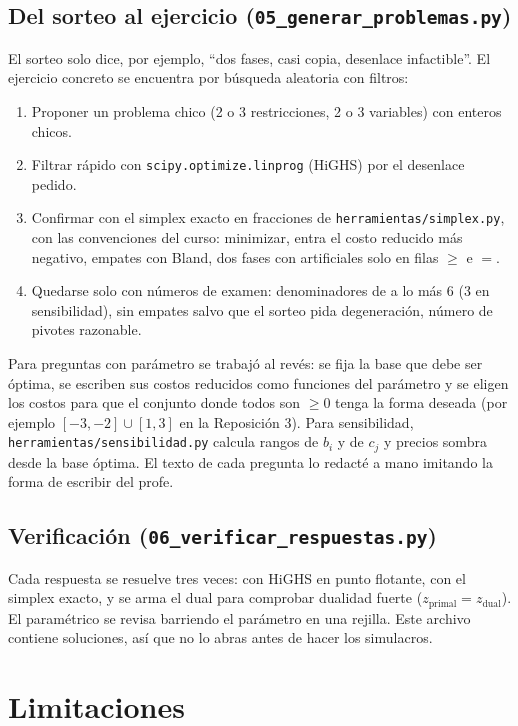 \documentclass[11pt]{article}
\newcommand{\cod}[1]{\texttt{#1}}
\begin{document}
\subsection{Del sorteo al ejercicio (\cod{05\_generar\_problemas.py})}
El sorteo solo dice, por ejemplo, ``dos fases, casi copia, desenlace infactible''. El ejercicio
concreto se encuentra por búsqueda aleatoria con filtros:
\begin{enumerate}
\item Proponer un problema chico (2 o 3 restricciones, 2 o 3 variables) con enteros chicos.
\item Filtrar rápido con \cod{scipy.optimize.linprog} (HiGHS) por el desenlace pedido.
\item Confirmar con el simplex exacto en fracciones de \cod{herramientas/simplex.py}, con las
convenciones del curso: minimizar, entra el costo reducido más negativo, empates con Bland, dos
fases con artificiales solo en filas $\ge$ e $=$.
\item Quedarse solo con números de examen: denominadores de a lo más 6 (3 en sensibilidad), sin
empates salvo que el sorteo pida degeneración, número de pivotes razonable.
\end{enumerate}
Para preguntas con parámetro se trabajó al revés: se fija la base que debe ser óptima, se
escriben sus costos reducidos como funciones del parámetro y se eligen los costos para que el
conjunto donde todos son $\ge0$ tenga la forma deseada (por ejemplo $[-3,-2]\cup[1,3]$ en la
Reposición 3). Para sensibilidad, \cod{herramientas/sensibilidad.py} calcula rangos de $b_i$ y
de $c_j$ y precios sombra desde la base óptima. El texto de cada pregunta lo redacté a mano
imitando la forma de escribir del profe.

\subsection{Verificación (\cod{06\_verificar\_respuestas.py})}
Cada respuesta se resuelve tres veces: con HiGHS en punto flotante, con el simplex exacto, y
se arma el dual para comprobar dualidad fuerte ($z_{\text{primal}}=z_{\text{dual}}$). El
paramétrico se revisa barriendo el parámetro en una rejilla. Este archivo contiene soluciones,
así que no lo abras antes de hacer los simulacros.

\section{Limitaciones}\label{sec:lim}
\end{document}
